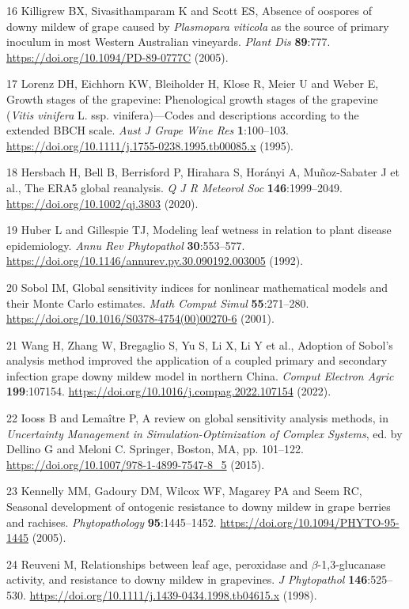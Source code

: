 \documentclass{article}
\begin{document}
16 Killigrew BX, Sivasithamparam K and Scott ES, Absence of oospores of downy mildew of grape caused by \emph{Plasmopara viticola} as the source of primary inoculum in most Western Australian vineyards. \emph{Plant Dis} \textbf{89}:777. \url{https://doi.org/10.1094/PD-89-0777C} (2005).

17 Lorenz DH, Eichhorn KW, Bleiholder H, Klose R, Meier U and Weber E, Growth stages of the grapevine: Phenological growth stages of the grapevine (\emph{Vitis vinifera} L. ssp. vinifera)---Codes and descriptions according to the extended BBCH scale. \emph{Aust J Grape Wine Res} \textbf{1}:100--103. \url{https://doi.org/10.1111/j.1755-0238.1995.tb00085.x} (1995).

18 Hersbach H, Bell B, Berrisford P, Hirahara S, Horányi A, Muñoz-Sabater J et al., The ERA5 global reanalysis. \emph{Q J R Meteorol Soc} \textbf{146}:1999--2049. \url{https://doi.org/10.1002/qj.3803} (2020).

19 Huber L and Gillespie TJ, Modeling leaf wetness in relation to plant disease epidemiology. \emph{Annu Rev Phytopathol} \textbf{30}:553--577. \url{https://doi.org/10.1146/annurev.py.30.090192.003005} (1992).

20 Sobol IM, Global sensitivity indices for nonlinear mathematical models and their Monte Carlo estimates. \emph{Math Comput Simul} \textbf{55}:271--280. \url{https://doi.org/10.1016/S0378-4754(00)00270-6} (2001).

21 Wang H, Zhang W, Bregaglio S, Yu S, Li X, Li Y et al., Adoption of Sobol's analysis method improved the application of a coupled primary and secondary infection grape downy mildew model in northern China. \emph{Comput Electron Agric} \textbf{199}:107154. \url{https://doi.org/10.1016/j.compag.2022.107154} (2022).

22 Iooss B and Lemaître P, A review on global sensitivity analysis methods, in \emph{Uncertainty Management in Simulation-Optimization of Complex Systems}, ed. by Dellino G and Meloni C. Springer, Boston, MA, pp. 101--122. \url{https://doi.org/10.1007/978-1-4899-7547-8\_5} (2015).

23 Kennelly MM, Gadoury DM, Wilcox WF, Magarey PA and Seem RC, Seasonal development of ontogenic resistance to downy mildew in grape berries and rachises. \emph{Phytopathology} \textbf{95}:1445--1452. \url{https://doi.org/10.1094/PHYTO-95-1445} (2005).

24 Reuveni M, Relationships between leaf age, peroxidase and \(\beta\)-1,3-glucanase activity, and resistance to downy mildew in grapevines. \emph{J Phytopathol} \textbf{146}:525--530. \url{https://doi.org/10.1111/j.1439-0434.1998.tb04615.x} (1998).
\end{document}
